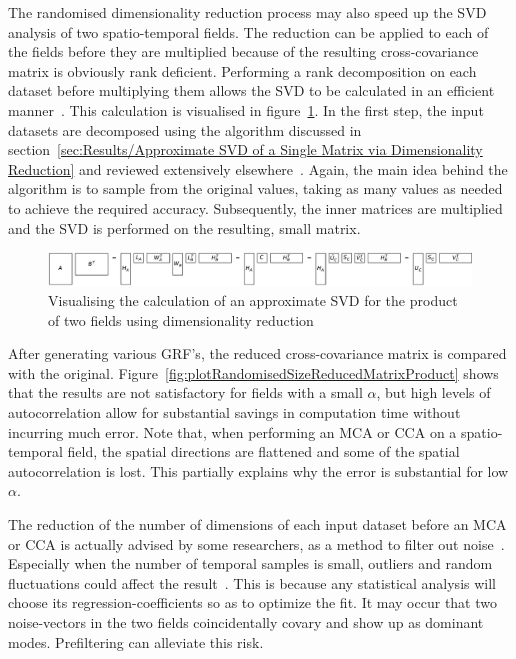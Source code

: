 \documentclass[ijgi,article,submit,moreauthors,pdftex,10pt,a4paper]{Definitions/mdpi}
\begin{document}
The randomised dimensionality reduction process may also speed up the SVD analysis of two spatio-temporal fields. The reduction can be applied to each of the fields before they are multiplied because of the resulting cross-covariance matrix is obviously rank deficient. Performing a rank decomposition on each dataset before multiplying them allows the SVD to be calculated in an efficient manner~\cite{Chan1982, Tygert2017}. This calculation is visualised in figure~\ref{fig:randomisedSquareProductSVD}. In the first step, the input datasets are decomposed using the algorithm discussed in section~\ref{sec:Results/Approximate SVD of a Single Matrix via Dimensionality Reduction} and reviewed extensively elsewhere~\cite{Halko2011, Li2016}. Again, the main idea behind the algorithm is to sample from the original values, taking as many values as needed to achieve the required accuracy. Subsequently, the inner matrices are multiplied and the SVD is performed on the resulting, small matrix.

\begin{figure}[H]
\centering
\includegraphics[width=\textwidth]{Results/randomisedSquareProductSVD.pdf}
\caption[Approximate product SVD]{Visualising the calculation of an approximate SVD for the product of two fields using dimensionality reduction}
\label{fig:randomisedSquareProductSVD}
\end{figure}

After generating various GRF's, the reduced cross-covariance matrix is compared with the original. Figure~\ref{fig:plotRandomisedSizeReducedMatrixProduct} shows that the results are not satisfactory for fields with a small $\alpha$, but high levels of autocorrelation allow for substantial savings in computation time without incurring much error. Note that, when performing an MCA or CCA on a spatio-temporal field, the spatial directions are flattened and some of the spatial autocorrelation is lost. This partially explains why the error is substantial for low $\alpha$.

The reduction of the number of dimensions of each input dataset before an MCA or CCA is actually advised by some researchers, as a method to filter out noise~\cite{Barnett1987}. Especially when the number of temporal samples is small, outliers and random fluctuations could affect the result~\cite{Bretherton1992}. This is because any statistical analysis will choose its regression-coefficients so as to optimize the fit. It may occur that two noise-vectors in the two fields coincidentally covary and show up as dominant modes. Prefiltering can alleviate this risk.
\end{document}
